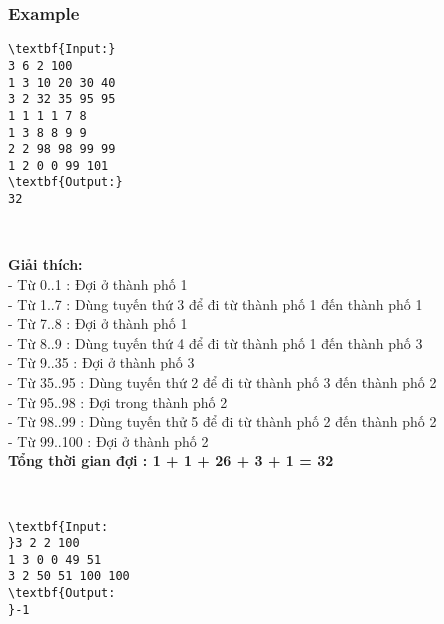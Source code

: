 \subsubsection{Example}
\begin{verbatim}
\textbf{Input:}
3 6 2 100
1 3 10 20 30 40
3 2 32 35 95 95
1 1 1 1 7 8
1 3 8 8 9 9
2 2 98 98 99 99
1 2 0 0 99 101
\textbf{Output:}
32\end{verbatim}

 

\textbf{Giải thích:}
\\- Từ 0..1 : Đợi ở thành phố 1
\\- Từ 1..7 : Dùng tuyến thứ 3 để đi từ thành phố 1 đến thành phố 1
\\- Từ 7..8 : Đợi ở thành phố 1
\\- Từ 8..9 : Dùng tuyến thứ 4 để đi từ thành phố 1 đến thành phố 3
\\- Từ 9..35 : Đợi ở thành phố 3
\\- Từ 35..95 : Dùng tuyến thứ 2 để đi từ thành phố 3 đến thành phố 2
\\- Từ 95..98 : Đợi trong thành phố 2
\\- Từ 98..99 : Dùng tuyến thử 5 để đi từ thành phố 2 đến thành phố 2
\\- Từ 99..100 : Đợi ở thành phố 2
\\\textbf{Tổng thời gian đợi : 1 + 1 + 26 + 3 + 1 = 32}

 
\begin{verbatim}
\textbf{Input:
}3 2 2 100
1 3 0 0 49 51
3 2 50 51 100 100
\textbf{Output:
}-1
\end{verbatim}

 